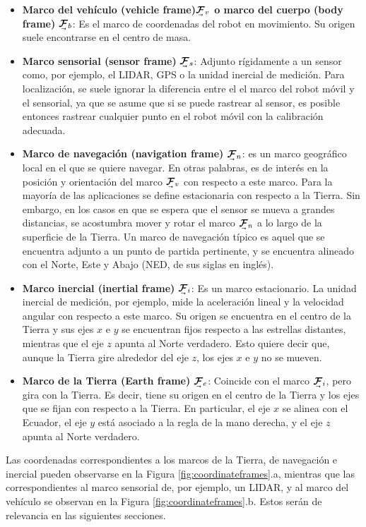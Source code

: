\begin{itemize}
    \item \textbf{Marco del vehículo (vehicle frame)$\undervec{\bm{\mathcal{F}}}_v$ o marco del cuerpo (body frame)} $\undervec{\bm{\mathcal{F}}}_b$: Es el marco de coordenadas del robot en movimiento. Su origen suele encontrarse en el centro de masa.
    \item \textbf{Marco sensorial (sensor frame)} $\undervec{\bm{\mathcal{F}}}_s$: Adjunto rígidamente a un sensor como, por ejemplo, el LIDAR, GPS o la unidad inercial de medición. Para localización, se suele ignorar la diferencia entre el el marco del robot móvil y el sensorial, ya que se asume que si se puede rastrear al sensor, es posible entonces rastrear cualquier punto en el robot móvil con la calibración adecuada.
    \item \textbf{Marco de navegación (navigation frame)} $\undervec{\bm{\mathcal{F}}}_n$: es un marco geográfico local en el que se quiere navegar. En otras palabras, es de interés en la posición y orientación del marco $\undervec{\bm{\mathcal{F}}}_v$ con respecto a este marco. Para la mayoría de las aplicaciones se define estacionaria con respecto a la Tierra. Sin embargo, en los casos en que se espera que el sensor se mueva a grandes distancias, se acostumbra mover y rotar el marco $\undervec{\bm{\mathcal{F}}}_n$ a lo largo de la superficie de la Tierra. Un marco de navegación típico es aquel que se encuentra adjunto a un punto de partida pertinente, y se encuentra alineado con el Norte, Este y Abajo (NED, de sus siglas en inglés).
    \item \textbf{Marco inercial (inertial frame)} $\undervec{\bm{\mathcal{F}}}_i$: Es un marco estacionario. La unidad inercial de medición, por ejemplo, mide la aceleración lineal y la velocidad angular con respecto a este marco. Su origen se encuentra en el centro de la Tierra y sus ejes $x$ e $y$ se encuentran fijos respecto a las estrellas distantes, mientras que el eje $z$ apunta al Norte verdadero. Esto quiere decir que, aunque la Tierra gire alrededor del eje $z$, los ejes $x$ e $y$ no se mueven.
    \item \textbf{Marco de la Tierra (Earth frame)} $\undervec{\bm{\mathcal{F}}}_e$: Coincide con el marco $\undervec{\bm{\mathcal{F}}}_i$, pero gira con la Tierra. Es decir, tiene su origen en el centro de la Tierra y los ejes que se fijan con respecto a la Tierra. En particular, el eje $x$ se alinea con el Ecuador, el eje $y$ está asociado a la regla de la mano derecha, y el eje $z$ apunta al Norte verdadero.
\end{itemize}

Las coordenadas correspondientes a los marcos de la Tierra, de navegación e inercial pueden observarse en la Figura \ref{fig:coordinateframes}.a, mientras que las correspondientes al marco sensorial de, por ejemplo, un LIDAR, y al marco del vehículo se observan en la Figura \ref{fig:coordinateframes}.b. Estos serán de relevancia en las siguientes secciones.